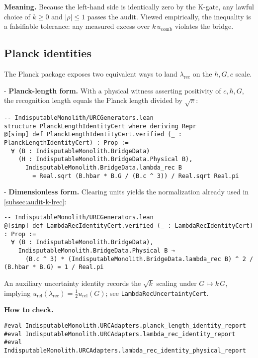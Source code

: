 \documentclass[11pt,a4paper,twoside]{article}
\numberwithin{equation}{section}
\theoremstyle{customthm}
\theoremstyle{customdef}
\theoremstyle{customrem}
\begin{document}
\noindent \textbf{Meaning.} Because the left-hand side is identically zero by the K-gate, any lawful choice of \(k\ge 0\) and \(|\rho|\le 1\) passes the audit. Viewed empirically, the inequality is a falsifiable tolerance: any measured excess over \(k\,u_{\mathrm{comb}}\) violates the bridge.

\subsection{Planck identities}\label{subsec:audit-planck}

The Planck package exposes two equivalent ways to land \(\lambda_{\mathrm{rec}}\) on the \(\hbar,G,c\) scale.

- \textbf{Planck-length form.} With a physical witness asserting positivity of \(c,\hbar,G\), the recognition length equals the Planck length divided by \(\sqrt{\pi}\):
\begin{lstlisting}
-- IndisputableMonolith/URCGenerators.lean
structure PlanckLengthIdentityCert where deriving Repr
@[simp] def PlanckLengthIdentityCert.verified (_ : PlanckLengthIdentityCert) : Prop :=
  ∀ (B : IndisputableMonolith.BridgeData)
    (H : IndisputableMonolith.BridgeData.Physical B),
      IndisputableMonolith.BridgeData.lambda_rec B
        = Real.sqrt (B.hbar * B.G / (B.c ^ 3)) / Real.sqrt Real.pi
\end{lstlisting}

- \textbf{Dimensionless form.} Clearing units yields the normalization already used in \cref{subsec:audit-k-lrec}:
\begin{lstlisting}
-- IndisputableMonolith/URCGenerators.lean
@[simp] def LambdaRecIdentityCert.verified (_ : LambdaRecIdentityCert) : Prop :=
  ∀ (B : IndisputableMonolith.BridgeData),
    IndisputableMonolith.BridgeData.Physical B →
      (B.c ^ 3) * (IndisputableMonolith.BridgeData.lambda_rec B) ^ 2 / (B.hbar * B.G) = 1 / Real.pi
\end{lstlisting}

An auxiliary uncertainty identity records the \(\sqrt{k}\) scaling under \(G\mapsto k\,G\), implying \(u_{\mathrm{rel}}(\lambda_{\mathrm{rec}})=\tfrac12 u_{\mathrm{rel}}(G)\); see \texttt{LambdaRecUncertaintyCert}.

\noindent \textbf{How to check.}
\begin{lstlisting}
#eval IndisputableMonolith.URCAdapters.planck_length_identity_report
#eval IndisputableMonolith.URCAdapters.lambda_rec_identity_report
#eval IndisputableMonolith.URCAdapters.lambda_rec_identity_physical_report
\end{lstlisting}
\end{document}
